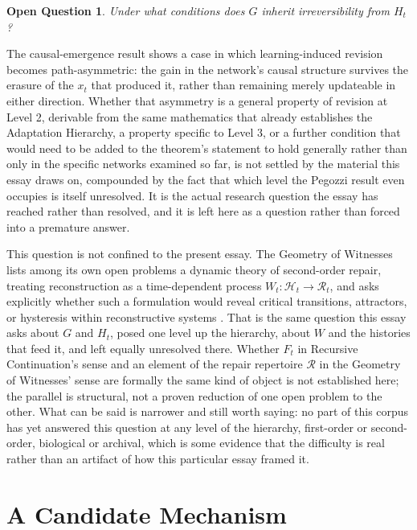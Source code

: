 \documentclass[11pt]{article}
\newtheorem{question}{Open Question}[section]
\begin{document}
\begin{question}
Under what conditions does $G$ inherit irreversibility from $H_t$?
\end{question}

The causal-emergence result shows a case in which learning-induced revision becomes path-asymmetric: the gain in the network's causal structure survives the erasure of the $x_t$ that produced it, rather than remaining merely updateable in either direction. Whether that asymmetry is a general property of revision at Level 2, derivable from the same mathematics that already establishes the Adaptation Hierarchy, a property specific to Level 3, or a further condition that would need to be added to the theorem's statement to hold generally rather than only in the specific networks examined so far, is not settled by the material this essay draws on, compounded by the fact that which level the Pegozzi result even occupies is itself unresolved. It is the actual research question the essay has reached rather than resolved, and it is left here as a question rather than forced into a premature answer.

This question is not confined to the present essay. The Geometry of Witnesses lists among its own open problems a dynamic theory of second-order repair, treating reconstruction as a time-dependent process $W_t: \mathcal{H}_t \to \mathcal{R}_t$, and asks explicitly whether such a formulation would reveal critical transitions, attractors, or hysteresis within reconstructive systems \cite{geometryofwitnesses}. That is the same question this essay asks about $G$ and $H_t$, posed one level up the hierarchy, about $W$ and the histories that feed it, and left equally unresolved there. Whether $F_t$ in Recursive Continuation's sense and an element of the repair repertoire $\mathcal{R}$ in the Geometry of Witnesses' sense are formally the same kind of object is not established here; the parallel is structural, not a proven reduction of one open problem to the other. What can be said is narrower and still worth saying: no part of this corpus has yet answered this question at any level of the hierarchy, first-order or second-order, biological or archival, which is some evidence that the difficulty is real rather than an artifact of how this particular essay framed it.

\section{A Candidate Mechanism}
\end{document}
